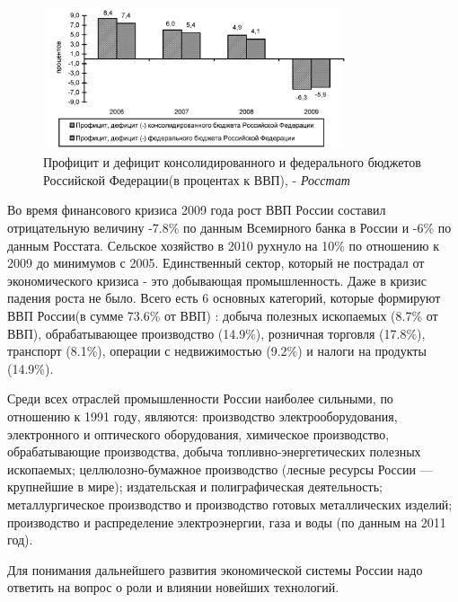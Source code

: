 \documentclass[a4paper,12pt]{article}
\begin{document}
\begin{figure}[htb]
\centering
\includegraphics[width=0.8\textwidth]{Image3549.jpeg}
\caption{Профицит и дефицит консолидированного и федерального бюджетов
Российской Федерации(в процентах к ВВП), - \textit{Росстат\cite{Rosstat}}}
\label{}
\end{figure}

Во время финансового кризиса 2009 года рост ВВП России составил отрицательную
величину -7.8\% по данным Всемирного банка в России и -6\% по данным Росстата.
Сельское хозяйство в 2010 рухнуло на 10\% по отношению к 2009 до минимумов с
2005. Единственный сектор, который не пострадал от экономического кризиса - это 
добывающая промышленность. Даже в кризис падения роста не было. Всего есть 6 
основных категорий, которые формируют ВВП России(в сумме 73.6\%
от ВВП) :
 добыча полезных ископаемых  (8.7\% от ВВП), 
 обрабатывающее производство (14.9\%), 
 розничная торговля (17.8\%), 
 транспорт (8.1\%), 
 операции с недвижимостью (9.2\%) и 
 налоги на продукты (14.9\%).

Среди всех отраслей промышленности России наиболее сильными, по отношению к 1991
году, являются: производство электрооборудования, электронного и оптического
оборудования, химическое производство, обрабатывающие производства, добыча топливно-энергетических полезных 
ископаемых; целлюлозно-бумажное производство (лесные ресурсы России — крупнейшие в мире); 
издательская и полиграфическая деятельность; металлургическое производство и производство 
готовых металлических изделий; производство и распределение электроэнергии, газа
и воды (по данным на 2011 год).

Для понимания дальнейшего развития экономической системы России надо ответить
на вопрос о роли и влиянии новейших технологий. 
\end{document}
